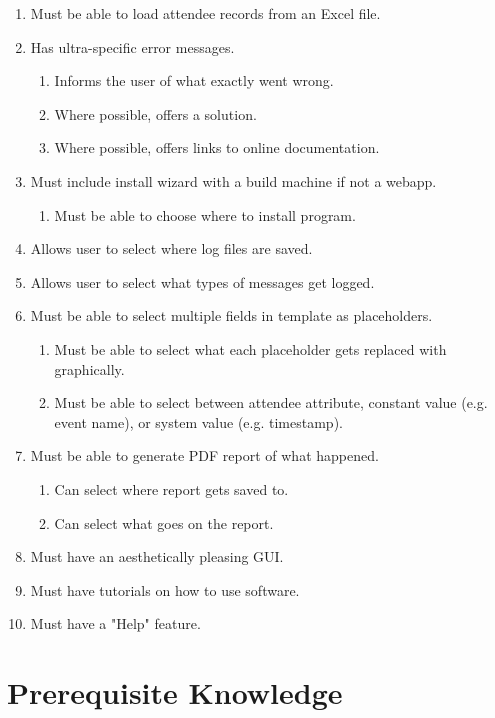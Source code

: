 \documentclass[11pt]{article}
\begin{document}
\begin{enumerate}
    \item Must be able to load attendee records from an Excel file.
    \item Has ultra-specific error messages.
    \begin{enumerate}
        \item Informs the user of what exactly went wrong.
        \item Where possible, offers a solution.
        \item Where possible, offers links to online documentation.
    \end{enumerate}
    \item Must include install wizard with a build machine if not a webapp.
    \begin{enumerate}
        \item Must be able to choose where to install program.
    \end{enumerate}
    \item Allows user to select where log files are saved.
    \item Allows user to select what types of messages get logged.
    \item Must be able to select multiple fields in template as placeholders.
    \begin{enumerate}
        \item Must be able to select what each placeholder gets replaced with graphically.
        \item Must be able to select between attendee attribute, constant value (e.g. event name), or system value (e.g. timestamp).
    \end{enumerate}
    \item Must be able to generate PDF report of what happened.
    \begin{enumerate}
        \item Can select where report gets saved to.
        \item Can select what goes on the report.
    \end{enumerate}
    \item Must have an aesthetically pleasing GUI.
    \item Must have tutorials on how to use software.
    \item Must have a "Help" feature.
\end{enumerate}

\newpage

\section{Prerequisite Knowledge}
\end{document}
